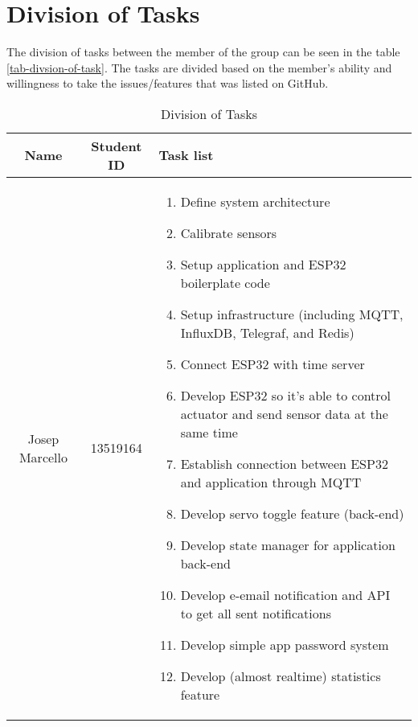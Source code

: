 \section*{Division of Tasks}

The division of tasks between the member of the group can be
seen in the table \ref{tab-divsion-of-task}.
The tasks are divided based on the member's ability and
willingness to take the issues/features that was listed on GitHub.

\begin{table}[htbp]
	\caption{Division of Tasks}
	\begin{center}
		\begin{tabular}{|c|c|p{3cm}|}
			\hline
			\textbf{Name}    & \textbf{Student ID} & \textbf{Task list}                                                                        \\
			\hline
			Josep Marcello   & 13519164            & \begin{enumerate}[leftmargin=*]
				                                         \item Define system architecture
				                                         \item Calibrate sensors
				                                         \item Setup application and ESP32 boilerplate code
				                                         \item Setup infrastructure (including MQTT, InfluxDB, Telegraf, and Redis)
				                                         \item Connect ESP32 with time server
				                                         \item Develop ESP32 so it's able to control actuator and send sensor data at the same time
				                                         \item Establish connection between ESP32 and application through MQTT
				                                         \item Develop servo toggle feature (back-end)
				                                         \item Develop state manager for application back-end
				                                         \item Develop e-email notification and API to get all sent notifications
				                                         \item Develop simple app password system
				                                         \item Develop (almost realtime) statistics feature

\end{enumerate}
\end{tabular}
\end{center}
\end{table}
